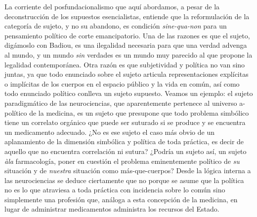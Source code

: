 La corriente del posfundacionalismo que aquí abordamos, a pesar de la deconstrucción de los supuestos esencialistas, entiende que la reformulación de la categoría de sujeto, y no su abandono, es condición \emph{sine-qua-non} para un pensamiento político de corte emancipatorio. Una de las razones es que el sujeto, digámoslo con Badiou, es una ilegalidad necesaria para que una verdad advenga al mundo, y un mundo \emph{sin} verdades es un mundo muy parecido al que propone la legalidad contemporánea. Otra razón es que subjetividad y política no van sino juntas, ya que todo enunciado sobre el sujeto articula representaciones explícitas o implícitas de los cuerpos en el espacio público y la vida en común, así como todo enunciado político conlleva un sujeto supuesto. Veamos un ejemplo: el sujeto paradigmático de las neurociencias, que aparentemente pertenece al universo a-político de la medicina, es un sujeto que presupone que todo problema simbólico tiene un correlato orgánico que puede ser suturado si se produce y se encuentra un medicamento adecuado. ¿No es ese sujeto el caso más obvio de un aplanamiento de la dimensión simbólica y política de toda práctica, es decir de aquello que no encuentra correlación ni sutura? ¿Podría un sujeto así, un sujeto \emph{àla} farmacología, poner en cuestión el problema eminentemente político de \emph{su} situación y de \emph{nuestra} situación como más-que-cuerpos? Desde la lógica interna a las neurociencias se deduce ciertamente que no porque se asume que la política no es lo que atraviesa a toda práctica con incidencia sobre lo común sino simplemente una profesión que, análoga a esta concepción de la medicina, en lugar de administrar medicamentos administra los recursos del Estado.

